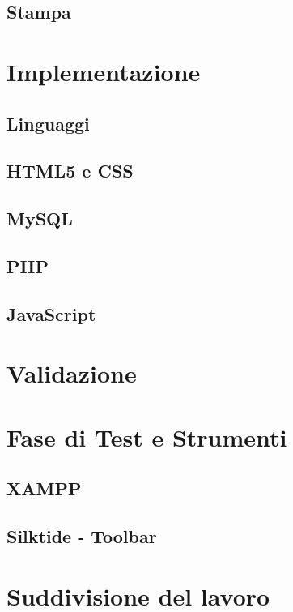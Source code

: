 \documentclass[a4paper, dvipsnames, table]{article}
\begin{document}
	\subsection{Stampa}

\newpage
\section{Implementazione}%
	\subsection{Linguaggi}
		\subsection{HTML5 e CSS}
		\subsection{MySQL}
			
		\subsection{PHP}
		\subsection{JavaScript}

\newpage
\section{Validazione}%
	

\newpage
\section{Fase di Test e Strumenti}%
	\subsection{XAMPP}
		
	\subsection*{Silktide - Toolbar}	
	
\newpage
\section{Suddivisione del lavoro}
\end{document}
